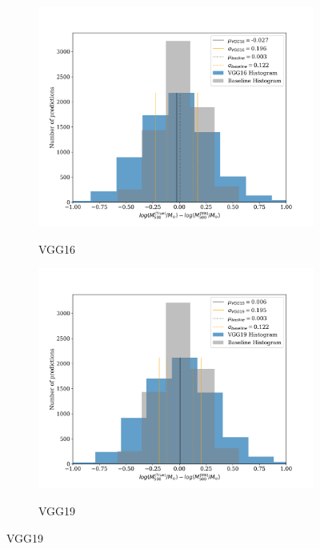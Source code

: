 \begin{figure}[H]
\centering
\begin{subfigure}{.325\textwidth}
    \centering
    \includegraphics[width=\linewidth]{images/Chapter4/Results/training_VGG16_hist.png}
    \label{fig:training_VGG16_hist}
    \caption{VGG16}
\end{subfigure}
\begin{subfigure}{.325\textwidth}
    \centering
    \includegraphics[width=\linewidth]{images/Chapter4/Results/training_VGG19_hist.png}
    \label{fig:training_VGG19_hist}
    \caption{VGG19}
\end{subfigure}

\end{figure}
